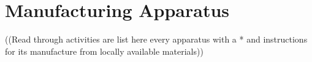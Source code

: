 \section{Manufacturing Apparatus}

((Read through activities are list here every apparatus with a * and instructions for its manufacture from locally available materials))